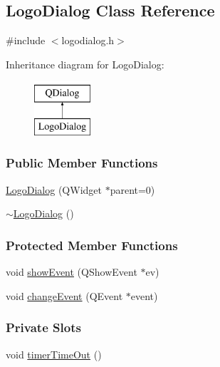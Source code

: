 \hypertarget{classLogoDialog}{}\subsection{Logo\+Dialog Class Reference}
\label{classLogoDialog}


{\ttfamily \#include $<$logodialog.\+h$>$}

Inheritance diagram for Logo\+Dialog\+:\begin{figure}[H]
\begin{center}
\leavevmode
\includegraphics[height=2.000000cm]{classLogoDialog}
\end{center}
\end{figure}
\subsubsection*{Public Member Functions}
\begin{DoxyCompactItemize}
\item 
\mbox{\hyperlink{classLogoDialog_a9457ef5a8c6428bebfa1c56f2d8c9fd1}{Logo\+Dialog}} (Q\+Widget $\ast$parent=0)
\item 
\mbox{\hyperlink{classLogoDialog_a956fbb52cdf488707c5f5a1877727c27}{$\sim$\+Logo\+Dialog}} ()
\end{DoxyCompactItemize}
\subsubsection*{Protected Member Functions}
\begin{DoxyCompactItemize}
\item 
void \mbox{\hyperlink{classLogoDialog_a3c16eea6dbd9e8c50c23444377a9ed12}{show\+Event}} (Q\+Show\+Event $\ast$ev)
\item 
void \mbox{\hyperlink{classLogoDialog_a5d44bdd4d14eed3468e422187ea49a3e}{change\+Event}} (Q\+Event $\ast$event)
\end{DoxyCompactItemize}
\subsubsection*{Private Slots}
\begin{DoxyCompactItemize}
\item 
void \mbox{\hyperlink{classLogoDialog_a7e819a837c81cadaf3cf016b6638b253}{timer\+Time\+Out}} ()
\end{DoxyCompactItemize}
